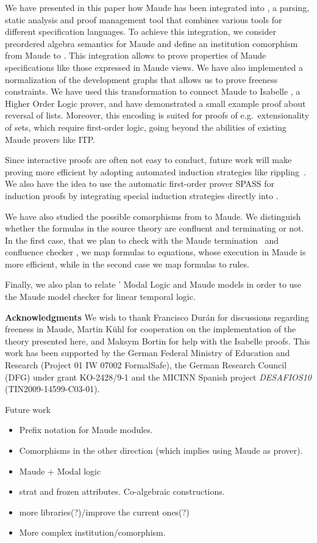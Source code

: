 
We have presented in this paper how Maude has been integrated into
\Hets, a parsing, static analysis and proof management tool that
combines various tools for different specification languages. To
achieve this integration, we consider preordered algebra semantics for
Maude and define an institution comorphism from Maude to \CASL.  This
integration allows to prove properties of Maude specifications like
those expressed in Maude views. We have also implemented a
normalization of the development graphs that allows us to prove
freeness constraints. We have used this transformation to connect
Maude to Isabelle \cite{Isabelle02}, a Higher Order Logic prover, and
have demonstrated a small example proof about reversal of lists.
Moreover, this encoding is suited for proofs of e.g.\ extensionality
of sets, which require first-order logic, going beyond the abilities
of existing Maude provers like ITP.

Since interactive proofs are often not easy to conduct, future work
will make proving more efficient by adopting automated induction
strategies like rippling~\cite{DBLP:conf/tphol/DixonF04}.  We also
have the idea to use the automatic first-order prover SPASS for
induction proofs by integrating special induction strategies directly
into \Hets.

We have also studied the possible comorphisms from \CASL to Maude. We
distinguish whether the formulas in the source theory are confluent and
terminating or not. In the first case, that we plan to check with the
Maude termination~\cite{MTT08} and confluence checker \cite{ChurchRoss10},
we map formulas to equations,
whose execution in Maude is more efficient, while in the second case
we map formulas to rules.

Finally, we also plan to relate \Hets' Modal Logic and Maude models in order to use
the Maude model checker \cite[Chapter 13]{maude-book} for linear temporal
logic.


\textbf{Acknowledgments} We wish to thank Francisco Dur\'an for discussions 
regarding freeness in Maude, Martin K\"uhl for cooperation
on the implementation of the theory presented here,
and Maksym Bortin for help with the Isabelle proofs.
This work has been
supported by the German Federal Ministry of Education and Research
(Project 01 IW 07002 FormalSafe), the German Research Council (DFG)
under grant KO-2428/9-1 and the MICINN Spanish project
\emph{DESAFIOS10} (TIN2009-14599-C03-01).


Future work
\begin{itemize}
\item Prefix notation for Maude modules.
\item Comorphisms in the other direction (which implies using Maude
as prover).
\item Maude + Modal logic
\item strat and frozen attributes. Co-algebraic constructions.
\item more libraries(?)/improve the current ones(?)
\item More complex institution/comorphism.
\end{itemize}